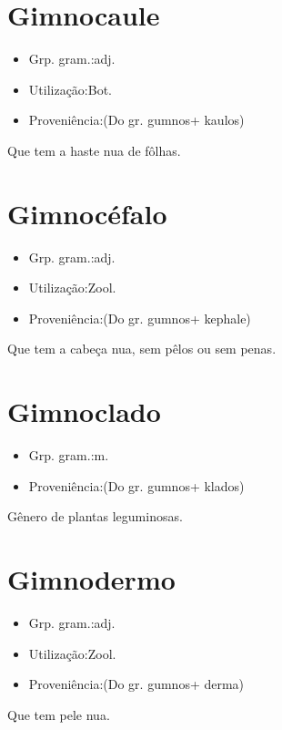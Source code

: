 \section{Gimnocaule}
\begin{itemize}
\item {Grp. gram.:adj.}
\end{itemize}
\begin{itemize}
\item {Utilização:Bot.}
\end{itemize}
\begin{itemize}
\item {Proveniência:(Do gr. \textunderscore gumnos\textunderscore  + \textunderscore kaulos\textunderscore )}
\end{itemize}
Que tem a haste nua de fôlhas.
\section{Gimnocéfalo}
\begin{itemize}
\item {Grp. gram.:adj.}
\end{itemize}
\begin{itemize}
\item {Utilização:Zool.}
\end{itemize}
\begin{itemize}
\item {Proveniência:(Do gr. \textunderscore gumnos\textunderscore  + \textunderscore kephale\textunderscore )}
\end{itemize}
Que tem a cabeça nua, sem pêlos ou sem penas.
\section{Gimnoclado}
\begin{itemize}
\item {Grp. gram.:m.}
\end{itemize}
\begin{itemize}
\item {Proveniência:(Do gr. \textunderscore gumnos\textunderscore  + \textunderscore klados\textunderscore )}
\end{itemize}
Gênero de plantas leguminosas.
\section{Gimnodermo}
\begin{itemize}
\item {Grp. gram.:adj.}
\end{itemize}
\begin{itemize}
\item {Utilização:Zool.}
\end{itemize}
\begin{itemize}
\item {Proveniência:(Do gr. \textunderscore gumnos\textunderscore  + \textunderscore derma\textunderscore )}
\end{itemize}
Que tem pele nua.
